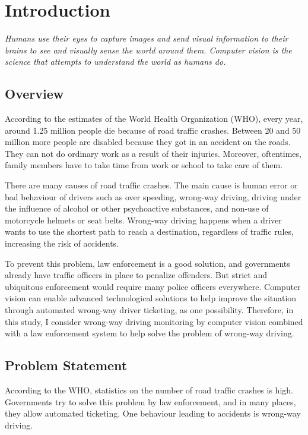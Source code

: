 \setlength{\footskip}{8mm}

\chapter{Introduction}

\textit{Humans use their eyes to capture images and send visual information to their brains to see and visually sense the world around them. Computer vision is the science that attempts to understand the world as humans do.}

\section{Overview}

According to the estimates of the World Health Organization (WHO), every year, around 1.25 million people die because of road traffic crashes. Between 20 and 50 million more people are disabled because they got in an accident on the roads. They can not do ordinary work as a result of their injuries. Moreover, oftentimes, family members have to take time from work or school to take care of them.

There are many causes of road traffic crashes. The main cause is human error or bad behaviour of drivers such as over speeding, wrong-way driving, driving under the influence of alcohol or other psychoactive substances, and non-use of motorcycle helmets or seat belts. Wrong-way driving happens when a driver wants to use the shortest path to reach a destination, regardless of traffic rules, increasing the risk of accidents.

To prevent this problem, law enforcement is a good solution, and governments already have traffic officers in place to penalize offenders. But strict and ubiquitous enforcement would require many police officers everywhere. 
Computer vision can enable advanced technological solutions to help improve the situation through automated wrong-way driver ticketing, as one possibility. Therefore, in this study, I consider wrong-way driving monitoring by computer vision combined with a law enforcement system to help solve the problem of wrong-way driving.

\section{Problem Statement}

According to the WHO, statistics on the number of road traffic crashes is high. Governments try to solve this problem by law enforcement, and in many places, they allow automated ticketing. One behaviour leading to accidents is wrong-way driving. 

